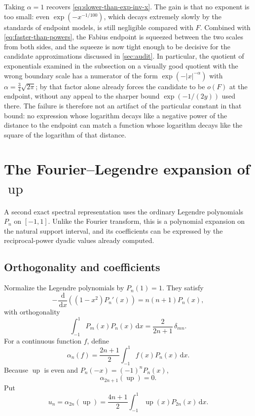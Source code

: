 \documentclass[11pt,oneside]{article}
\theoremstyle{definition}
\theoremstyle{remark}
\newcommand{\Up}{\operatorname{up}}
\newcommand{\dd}{\,\mathrm d}
\newcommand{\smallo}{o}
\begin{document}
Taking $\alpha=1$ recovers \eqref{eq:slower-than-exp-inv-x}.  The gain is that no exponent is
too small: even $\exp(-x^{-1/100})$, which decays extremely slowly by the standards of
endpoint models, is still negligible compared with $F$.  Combined with
\eqref{eq:faster-than-powers}, the Fabius endpoint is squeezed between the two scales from
both sides, and the squeeze is now tight enough to be decisive for the candidate
approximations discussed in \cref{sec:audit}.  In particular, the quotient of exponentials
examined in the subsection on a visually good quotient with the wrong boundary scale has a
numerator of the form $\exp(-|x|^{-\alpha})$ with $\alpha=\tfrac34\sqrt{2\pi}$; by
 that factor alone already forces the candidate to be
$\smallo(F)$ at the endpoint, without any appeal to the sharper bound
$\exp(-1/(2y))$ used there.  The failure is therefore not an artifact of the particular
constant in that bound: no expression whose logarithm decays like a negative power of the
distance to the endpoint can match a function whose logarithm decays like the square of the
logarithm of that distance.

\section{The Fourier--Legendre expansion of $\Up$}
\label{sec:legendre}

A second exact spectral representation uses the ordinary Legendre polynomials $P_n$ on
$[-1,1]$.  Unlike the Fourier transform, this is a polynomial expansion on the natural
support interval, and its coefficients can be expressed by the reciprocal-power dyadic
values already computed.

\subsection{Orthogonality and coefficients}

Normalize the Legendre polynomials by $P_n(1)=1$.  They satisfy
\begin{equation}
 -\frac{\dd}{\dd x}\left((1-x^2)P_n'(x)\right)
 =n(n+1)P_n(x),                                            \label{eq:legendre-ode}
\end{equation}
with orthogonality
\begin{equation}
 \int_{-1}^{1}P_m(x)P_n(x)\dd x
 =\frac{2}{2n+1}\,\delta_{mn}.                            \label{eq:legendre-orthogonality}
\end{equation}
For a continuous function $f$, define
\begin{equation}
 \alpha_n(f)=\frac{2n+1}{2}\int_{-1}^{1}f(x)P_n(x)\dd x. \label{eq:legendre-coefficient}
\end{equation}
Because $\Up$ is even and $P_n(-x)=(-1)^nP_n(x)$,
\begin{equation}
 \alpha_{2n+1}(\Up)=0.                                    \label{eq:odd-legendre-zero}
\end{equation}
Put
\begin{equation}
 u_n=\alpha_{2n}(\Up)
 =\frac{4n+1}{2}\int_{-1}^{1}\Up(x)P_{2n}(x)\dd x.        \label{eq:un-legendre}
\end{equation}
\end{document}
